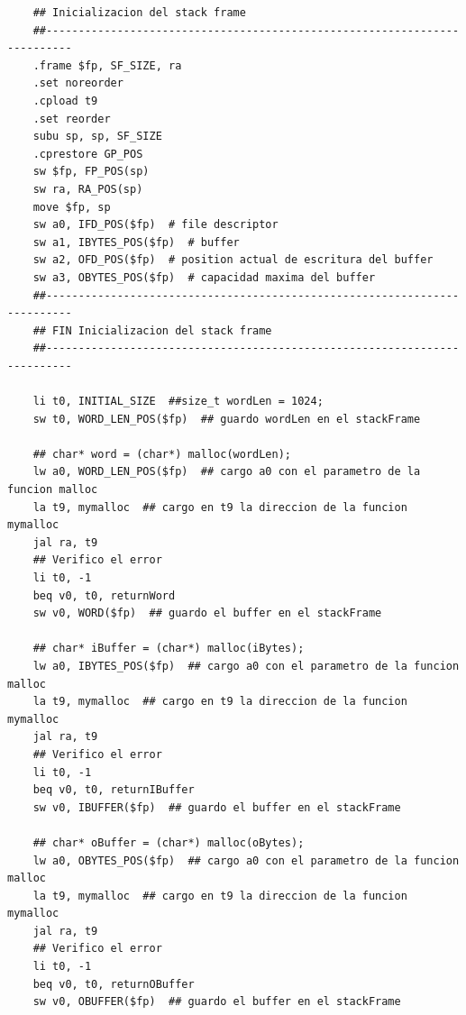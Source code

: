 \documentclass[a4paper,10pt]{article}
\begin{document}
\begin{lstlisting}
    ## Inicializacion del stack frame
    ##--------------------------------------------------------------------------
    .frame $fp, SF_SIZE, ra
    .set noreorder
    .cpload t9
    .set reorder
    subu sp, sp, SF_SIZE
    .cprestore GP_POS
    sw $fp, FP_POS(sp)
    sw ra, RA_POS(sp)
    move $fp, sp
    sw a0, IFD_POS($fp)  # file descriptor
    sw a1, IBYTES_POS($fp)  # buffer
    sw a2, OFD_POS($fp)  # position actual de escritura del buffer
    sw a3, OBYTES_POS($fp)  # capacidad maxima del buffer
    ##--------------------------------------------------------------------------
    ## FIN Inicializacion del stack frame
    ##--------------------------------------------------------------------------

    li t0, INITIAL_SIZE  ##size_t wordLen = 1024;
    sw t0, WORD_LEN_POS($fp)  ## guardo wordLen en el stackFrame

    ## char* word = (char*) malloc(wordLen);
    lw a0, WORD_LEN_POS($fp)  ## cargo a0 con el parametro de la funcion malloc
    la t9, mymalloc  ## cargo en t9 la direccion de la funcion mymalloc
    jal ra, t9
    ## Verifico el error
    li t0, -1
    beq v0, t0, returnWord
    sw v0, WORD($fp)  ## guardo el buffer en el stackFrame

    ## char* iBuffer = (char*) malloc(iBytes);
    lw a0, IBYTES_POS($fp)  ## cargo a0 con el parametro de la funcion malloc
    la t9, mymalloc  ## cargo en t9 la direccion de la funcion mymalloc
    jal ra, t9
    ## Verifico el error
    li t0, -1
    beq v0, t0, returnIBuffer
    sw v0, IBUFFER($fp)  ## guardo el buffer en el stackFrame

    ## char* oBuffer = (char*) malloc(oBytes);
    lw a0, OBYTES_POS($fp)  ## cargo a0 con el parametro de la funcion malloc
    la t9, mymalloc  ## cargo en t9 la direccion de la funcion mymalloc
    jal ra, t9
    ## Verifico el error
    li t0, -1
    beq v0, t0, returnOBuffer
    sw v0, OBUFFER($fp)  ## guardo el buffer en el stackFrame


\end{lstlisting}
\end{document}
